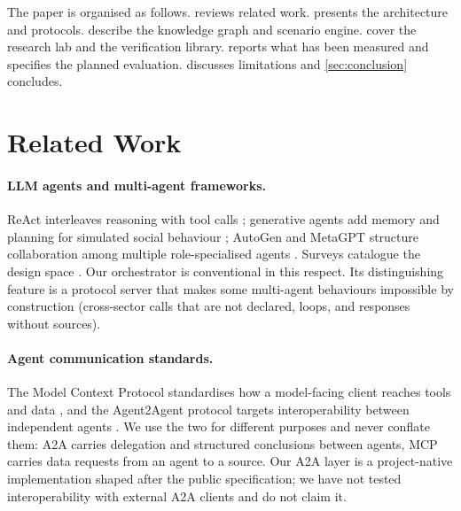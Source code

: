 \documentclass[conference]{IEEEtran}
\begin{document}
The paper is organised as follows.  reviews related work.  presents the architecture and protocols.  describe the knowledge graph and scenario engine.  cover the research lab and the verification library.  reports what has been measured and specifies the planned evaluation.  discusses limitations and \cref{sec:conclusion} concludes.

\section{Related Work}
\label{sec:related}

\paragraph{LLM agents and multi-agent frameworks.}
ReAct interleaves reasoning with tool calls \cite{yao2023react}; generative agents add memory and planning for simulated social behaviour \cite{park2023generative}; AutoGen and MetaGPT structure collaboration among multiple role-specialised agents \cite{wu2023autogen,hong2024metagpt}. Surveys catalogue the design space \cite{wang2024agentsurvey,guo2024masurvey}. Our orchestrator is conventional in this respect. Its distinguishing feature is a protocol server that makes some multi-agent behaviours impossible by construction (cross-sector calls that are not declared, loops, and responses without sources).

\paragraph{Agent communication standards.}
The Model Context Protocol standardises how a model-facing client reaches tools and data \cite{mcp2024}, and the Agent2Agent protocol targets interoperability between independent agents \cite{a2a2025}. We use the two for different purposes and never conflate them: A2A carries delegation and structured conclusions between agents, MCP carries data requests from an agent to a source. Our A2A layer is a project-native implementation shaped after the public specification; we have not tested interoperability with external A2A clients and do not claim it.
\end{document}
